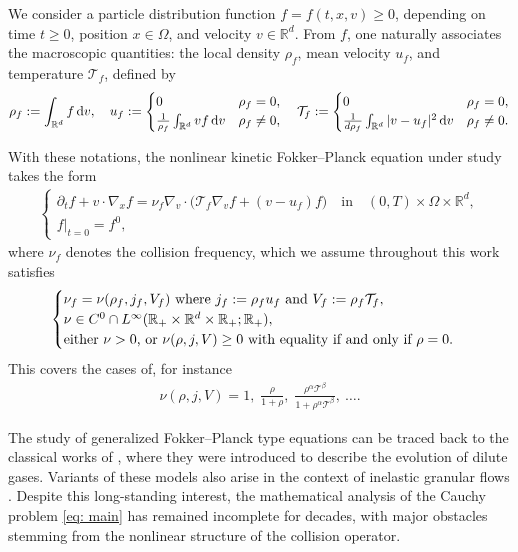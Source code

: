\documentclass[10pt, reqno]{amsart}
\theoremstyle{plain}
\theoremstyle{definition}
\theoremstyle{remark}
\numberwithin{equation}{section}
\newcommand{\calT}{\mathcal T}
\newcommand{\p}{\partial}
\newcommand{\R}{\mathbb{R}}
\newcommand{\dv}{\textnormal{d}v}
\newcommand{\intr}{\int_{\R^d}}
\begin{document}
We consider a particle distribution function $f = f(t,x,v) \geq 0$, depending on time $t \geq 0$, position $x \in \Omega$, and velocity $v \in \R^d$. From $f$, one naturally associates the macroscopic quantities: the local density $\rho_f$, mean velocity $u_f$, and temperature $\calT_f$, defined by
\begin{align*}
    \rho_f := \intr f\,\dv, \quad u_f := \begin{cases}
        0 & \rho_f = 0, \\
        \frac{1}{\rho_f}\intr vf\,\dv & \rho_f \ne 0,
    \end{cases}
    \quad \calT_f := \begin{cases}
        0 & \rho_f = 0, \\
        \frac{1}{d\rho_f}\intr |v-u_f|^2 \,\dv & \rho_f \ne 0.
    \end{cases}
\end{align*}


With these notations, the nonlinear kinetic Fokker--Planck equation under study takes the form
\begin{align}\label{eq: main}
    \begin{cases}
    \p_t f + v\cdot \nabla_x f = \nu_f \nabla_v\cdot \Big( \calT_f \nabla_v f + (v- u _f) f \Big) \quad \text{in} \quad (0,T)\times \Omega\times \R^d,\\
    f|_{t=0} = f^0,
    \end{cases}
\end{align}
where  $\nu_f$ denotes the collision frequency, which we assume throughout this work satisfies
\begin{equation} \label{ASSUMP NU}
    \begin{cases}
        \textnormal{$\nu_f = \nu(\rho_f, j_f, V_f)$ where $j_f := \rho_f u_f$ and $V_f := \rho_f \calT_f$},\\
        \nu\in C^0 \cap L^\infty(\R_+ \times \R^d \times \R_+ ; \R_+),\\
        \textnormal{either $\nu > 0$, or $\nu(\rho,j,V) \ge 0$ with equality if and only if $\rho = 0$}.
        \end{cases}
\end{equation}
This covers the cases of, for instance
\begin{align*}
    \nu(\rho, j, V) = 1, \; \frac{\rho}{1 + \rho}, \; \frac{\rho^{\alpha} \calT^{\beta}}{1 + \rho^{\alpha} \calT^{\beta}},\ \ldots .
\end{align*}

The study of generalized Fokker--Planck type equations can be traced back to the classical works of \cite{kirkwood1946, Green1952}, where they were introduced to describe the evolution of dilute gases. Variants of these models also arise in the context of inelastic granular flows \cite{BDS99}. Despite this long-standing interest, the mathematical analysis of the Cauchy problem \eqref{eq: main} has remained incomplete for decades, with major obstacles stemming from the nonlinear structure of the collision operator.
\end{document}
